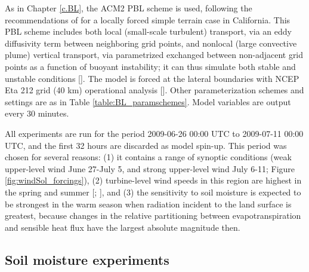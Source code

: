 As in Chapter \ref{c.BL}, the ACM2 PBL scheme is used, following the recommendations of \cite{marjanovic2014} for a locally forced simple terrain case in California.  This PBL scheme includes both local (small-scale turbulent) transport, via an eddy diffusivity term between neighboring grid points, and nonlocal (large convective plume) vertical transport, via parametrized exchanged between non-adjacent grid points as a function of buoyant instability; it can thus simulate both stable and unstable conditions [\cite{pleim2007combined}].  The model is forced at the lateral boundaries with NCEP Eta 212 grid (40 km) operational analysis [\cite{ncep}].  Other parameterization schemes and settings are as in Table \ref{table:BL_paramschemes}.  Model variables are output every 30 minutes.

All experiments are run for the period 2009-06-26 00:00 UTC to 2009-07-11 00:00 UTC, and the first 32 hours are discarded as model spin-up.  This period was chosen for several reasons: (1) it contains a range of synoptic conditions (weak upper-level wind June 27-July 5, and strong upper-level wind July 6-11; Figure \ref{fig:windSol_forcings}), (2) turbine-level wind speeds in this region are highest in the spring and summer [\cite{zhong2004diurnal}; \cite{mansbach2010synoptic}], and (3) the sensitivity to soil moisture is expected to be strongest in the warm season when radiation incident to the land surface is greatest, because changes in the relative partitioning between evapotranspiration and sensible heat flux have the largest absolute magnitude then.

\subsection{Soil moisture experiments}

